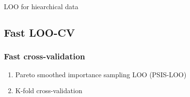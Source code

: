 \documentclass[10pt]{beamer}
\begin{document}
\begin{frame}{LOO for hiearchical data}
  \\

\end{frame}


\subsection{Fast LOO-CV}
\frame{\subsectionpage}

\begin{frame}{}

\frametitle{Fast cross-validation}

\begin{enumerate}
\item Pareto smoothed importance sampling LOO (PSIS-LOO)
\pause
\item K-fold cross-validation
\end{enumerate}

\vspace{12\baselineskip}


\end{frame}
\end{document}
